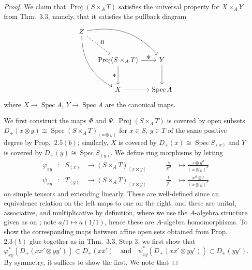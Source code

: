 \documentclass[12pt,letterpaper]{article}
\theoremstyle{definition}
\theoremstyle{remark}
\numberwithin{equation}{section}
\numberwithin{figure}{problem}
\DeclareMathOperator{\Spec}{Spec}
\DeclareMathOperator{\Proj}{Proj}
\begin{document}
\begin{proof}
  We claim that $\Proj(S \times_A T)$ satisfies the universal property for $X \times_A Y$ from Thm.~3.3, namely, that it satisfies the pullback diagram
  \begin{equation}\label{fpdiagram}
    \begin{tikzcd}[column sep=small,row sep=large]
      Z\arrow[bend left]{drr}\arrow[bend right]{ddr}\arrow[dashed]{dr}{\mathrm{H}}\\
      &\Proj(S \times_A T)\dar[swap]{\Phi} \rar{\Psi} & Y\dar\\
      &X \rar & \Spec A
    \end{tikzcd}
  \end{equation}
  where $X \to \Spec A$, $Y \to \Spec A$ are the canonical maps.
  \par We first construct the maps $\Phi$ and $\Psi$. $\Proj(S \times_A T)$ is covered by open subsets $D_+(x \otimes y) \cong \Spec(S \times_A T)_{(x \otimes y)}$ for $x \in S$, $y \in T$ of the same positive degree by Prop.~$2.5(b)$; similarly, $X$ is covered by $D_+(x) \cong \Spec S_{(x)}$ and $Y$ is covered by $D_+(y) \cong \Spec S_{(y)}$. We define ring morphisms by letting
  \begin{equation}\label{ringmapsdef}
    \begin{alignedat}{4}
      \varphi_{xy}&\colon & S_{(x)} &\to (S \times_A T)_{(x \otimes y)} \qquad &\frac{s}{x^d} &\mapsto \frac{s \otimes y^d}{(x \otimes y)^d}\\
      \psi_{xy}&\colon & T_{(y)} &\to (S \times_A T)_{(x \otimes y)} \qquad &\frac{t}{y^d} &\mapsto \frac{x^d \otimes t}{(x \otimes y)^d}
    \end{alignedat}
  \end{equation}
  on simple tensors and extending linearly. These are well-defined since an equivalence relation on the left maps to one on the right, and these are unital, associative, and multiplicative by definition, where we use the $A$-algebra structure given as on \cite[p.~31]{AM69}; note $a/1 \mapsto a(1/1)$, hence these are $A$-algebra homomorphisms. To show the corresponding maps between affine open sets obtained from Prop.~$2.3(b)$ glue together as in Thm.~3.3, Step 3, we first show that
  \begin{equation*}
    \varphi_{xy}^*\left( D_+(xx' \otimes yy') \right) \subset D_+(xx') \quad \text{and} \quad \psi_{xy}^*\left( D_+(xx' \otimes yy') \right) \subset D_+(yy').
  \end{equation*}
  By symmetry, it suffices to show the first. We note that

\end{proof}
\end{document}
